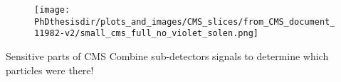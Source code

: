 \begin{frame}
\addtocounter{framenumber}{-1}
\transdissolve
\begin{minipage}[t]{.6\textwidth}
\begin{figure}
\texttt{[image: \\PhDthesisdir/plots\_and\_images/CMS\_slices/from\_CMS\_document\_11982-v2/small\_cms\_full\_no\_violet\_solen.png]}
\end{figure}
\end{minipage}
\hfill\begin{minipage}[t]{.35\textwidth}
\begin{block}{Sensitive parts of CMS}
Combine sub-detectors signals to determine which particles were there!
\end{block}
\end{minipage}
\end{frame}